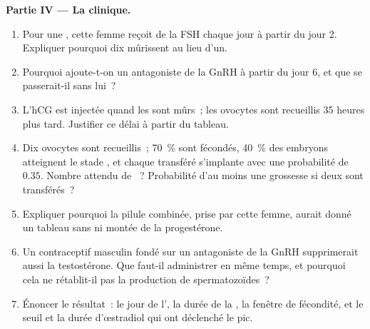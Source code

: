 \begin{problem}
\medskip
\noindent\textbf{Partie IV --- La clinique.}
\begin{enumerate}[resume]
  \item Pour une , cette femme reçoit de la FSH
        chaque jour à partir du jour 2. Expliquer pourquoi dix 
        mûrissent au lieu d'un.
  \item Pourquoi ajoute-t-on un antagoniste de la GnRH à partir du
        jour 6, et que se passerait-il sans lui~?
  \item L'hCG est injectée quand les  sont mûrs~; les ovocytes
        sont recueillis 35 heures plus tard. Justifier ce délai à partir
        du tableau.
  \item Dix ovocytes sont recueillis~; \qty{70}{\%} sont fécondés,
        \qty{40}{\%} des embryons atteignent le stade , et
        chaque  transféré s'implante avec une probabilité de
        $0.35$. Nombre attendu de ~? Probabilité d'au moins
        une grossesse si deux sont transférés~?
  \item Expliquer pourquoi la pilule combinée, prise par cette femme,
        aurait donné un tableau sans  ni montée de la
        progestérone.
  \item Un contraceptif masculin fondé sur un antagoniste de la GnRH
        supprimerait aussi la testostérone. Que faut-il administrer en
        même temps, et pourquoi cela ne rétablit-il pas la production de
        spermatozoïdes~?
  \item Énoncer le résultat~: le jour de l', la durée de la
        , la fenêtre de fécondité, et le seuil et la durée
        d'œstradiol qui ont déclenché le pic.
\end{enumerate}
\end{problem}
